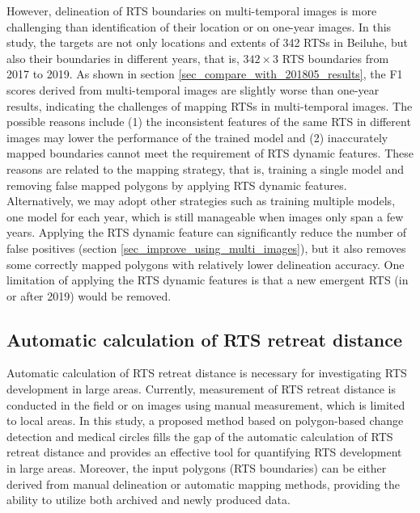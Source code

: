 \documentclass[authoryear,preprint,review,12pt]{elsarticle}
\begin{document}
However, delineation of RTS boundaries on multi-temporal images is more challenging than identification of their location or on one-year images. 
In this study, the targets are not only locations and extents of 342 RTSs in Beiluhe, but also their boundaries in different years, that is, $342\times3$ RTS boundaries from 2017 to 2019.
As shown in section \ref{sec_compare_with_201805_results}, the F1 scores derived from multi-temporal images are slightly worse than one-year results, indicating the challenges of mapping RTSs in multi-temporal images. 
The possible reasons include (1) the inconsistent features of the same RTS in different images may lower the performance of the trained model 
and (2) inaccurately mapped boundaries cannot meet the requirement of RTS dynamic features. 
These reasons are related to the mapping strategy, that is, training a single model and removing false mapped polygons by applying RTS dynamic features.  
Alternatively, we may adopt other strategies such as training multiple models, one model for each year,  which is still manageable when images only span a few years.
Applying the RTS dynamic feature can significantly reduce the number of false positives (section \ref{sec_improve_using_multi_images}), but it also removes some correctly mapped polygons with relatively lower delineation accuracy. 
One limitation of applying the RTS dynamic features is that a new emergent RTS (in or after 2019) would be removed. 



\subsection{Automatic calculation of RTS retreat distance}
\label{sec_diss_retreat_distance}

Automatic calculation of RTS retreat distance is necessary for investigating RTS development in large areas.
Currently, measurement of RTS retreat distance is conducted in the field or on images using manual measurement, which is limited to local areas. 
In this study, a proposed method based on polygon-based change detection and medical circles fills the gap of the automatic calculation of RTS retreat distance 
and provides an effective tool for quantifying RTS development in large areas. 
Moreover, the input polygons (RTS boundaries) can be either derived from manual delineation or automatic mapping methods, 
providing the ability to utilize both archived and newly produced data.
\end{document}
